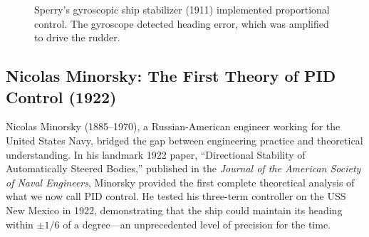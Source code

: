 \begin{figure}[htbp]
\centering
{}
\caption{Sperry's gyroscopic ship stabilizer (1911) implemented proportional control. The gyroscope detected heading error, which was amplified to drive the rudder.}
\label{fig:sperry_system}
\end{figure}

\subsection{Nicolas Minorsky: The First Theory of PID Control (1922)}

\begin{historicalbox}
Nicolas Minorsky (1885--1970), a Russian-American engineer working for the United States Navy, bridged the gap between engineering practice and theoretical understanding. In his landmark 1922 paper, ``Directional Stability of Automatically Steered Bodies,'' published in the \textit{Journal of the American Society of Naval Engineers}, Minorsky provided the first complete theoretical analysis of what we now call PID control. He tested his three-term controller on the USS New Mexico in 1922, demonstrating that the ship could maintain its heading within $\pm 1/6$ of a degree---an unprecedented level of precision for the time.
\end{historicalbox}

